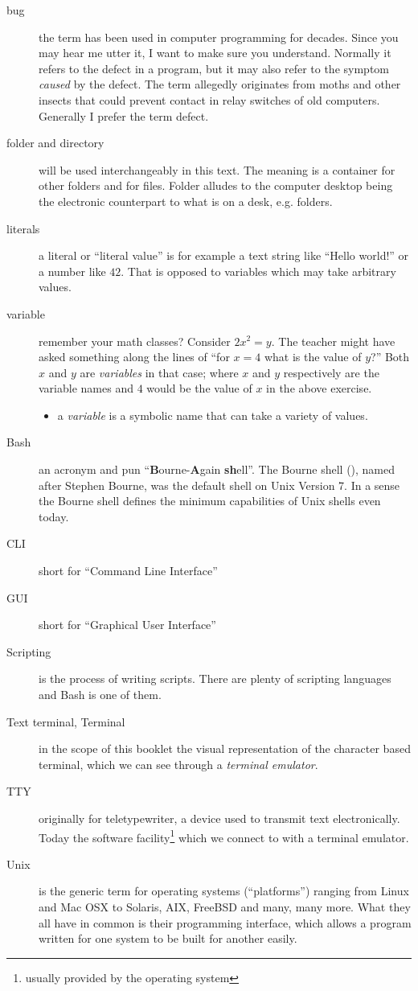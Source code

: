 \documentclass{olli-handout}
\begin{document}
\begin{description}
	\item[bug] the term  has been used in computer programming for decades. Since you may hear me utter it, I want to make sure you understand. Normally it refers to the defect in a program, but it may also refer to the symptom \emph{caused} by the defect. The term allegedly originates from moths and other insects that could prevent contact in relay switches of old computers. Generally I prefer the term defect.
	\item[folder and directory] will be used interchangeably in this text. The meaning is a container for other folders and for files. Folder alludes to the computer desktop being the electronic counterpart to what is on a desk, e.g. folders.
    \item[literals] a literal or ``literal value'' is for example a text string like ``Hello world!'' or a number like $42$. That is opposed to variables which may take arbitrary values.
	\item[variable] remember your math classes? Consider $2x^2 = y$. The teacher might have asked something along the lines of ``for $x = 4$ what is the value of $y$?'' Both $x$ and $y$ are \emph{variables} in that case; where $x$ and $y$ respectively are the variable names and $4$ would be the value of $x$ in the above exercise.
    \begin{itemize}
        \item[\olliHandLeft] a \emph{variable} is a symbolic name that can take a variety of values.
    \end{itemize}
	\item[Bash] an acronym and pun ``\textbf{B}ourne-\textbf{A}gain \textbf{sh}ell''. The Bourne shell (), named after Stephen Bourne, was the default shell on Unix Version 7. In a sense the Bourne shell defines the minimum capabilities of Unix shells even today.
	\item[CLI] short for ``Command Line Interface''
	\item[GUI] short for ``Graphical User Interface''
	\item[Scripting] is the process of writing scripts. There are plenty of scripting languages and Bash is one of them.
	\item[Text terminal, Terminal] in the scope of this booklet the visual representation of the character based terminal, which we can see through a \emph{terminal emulator}.
	\item[TTY] originally for teletypewriter, a device used to transmit text electronically. Today the software facility\footnote{usually provided by the operating system} which we connect to with a terminal emulator.
	\item[Unix] is the generic term for operating systems (``platforms'') ranging from Linux and Mac OSX to Solaris, AIX, FreeBSD and many, many more. What they all have in common is their programming interface, which allows a program written for one system to be built for another easily.
\end{description}
\end{document}
